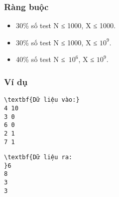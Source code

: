 \subsubsection{Ràng buộc}
\begin{itemize}
	\item 30\% số test N ≤ 1000, X ≤ 1000.
	\item 30\% số test N ≤ 1000, X ≤ $10^{9}$.
	\item 40\% số test N ≤ $10^{6}$, X ≤ $10^{9}$.
\end{itemize}

\subsubsection{Ví dụ}
\begin{verbatim}
\textbf{Dữ liệu vào:}
4 10
3 0
6 0
2 1
7 1\end{verbatim}
\begin{verbatim}
\textbf{Dữ liệu ra:
}6
8
3
3\end{verbatim}

 
